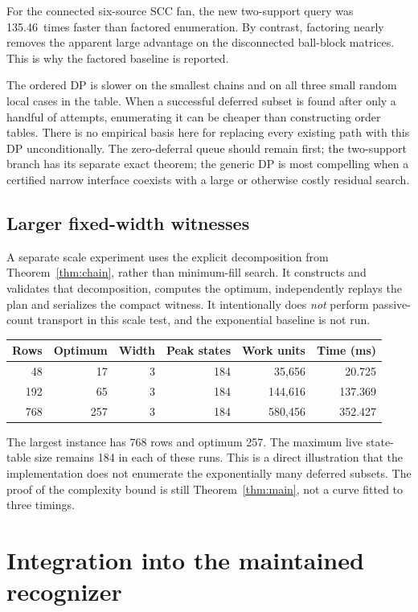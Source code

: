 \documentclass[11pt]{article}
\theoremstyle{definition}\newtheorem{definition}[theorem]{Definition}
\theoremstyle{remark}\newtheorem{remark}[theorem]{Remark}
\newcommand{\FanRatio}{135.46}
\begin{document}
For the connected six-source SCC fan, the new two-support query was \FanRatio\ times faster than factored enumeration. By contrast, factoring nearly removes the apparent large advantage on the disconnected ball-block matrices. This is why the factored baseline is reported.

The ordered DP is slower on the smallest chains and on all three small random local cases in the table. When a successful deferred subset is found after only a handful of attempts, enumerating it can be cheaper than constructing order tables. There is no empirical basis here for replacing every existing path with this DP unconditionally. The zero-deferral queue should remain first; the two-support branch has its separate exact theorem; the generic DP is most compelling when a certified narrow interface coexists with a large or otherwise costly residual search.

\subsection{Larger fixed-width witnesses}
A separate scale experiment uses the explicit decomposition from Theorem~\ref{thm:chain}, rather than minimum-fill search. It constructs and validates that decomposition, computes the optimum, independently replays the plan and serializes the compact witness. It intentionally does \emph{not} perform passive-count transport in this scale test, and the exponential baseline is not run.
\begin{center}
\begin{tabular}{rrrrrr}
\toprule
Rows & Optimum & Width & Peak states & Work units & Time (ms)\\
\midrule
48 & 17 & 3 & 184 & 35,656 & 20.725\\
192 & 65 & 3 & 184 & 144,616 & 137.369\\
768 & 257 & 3 & 184 & 580,456 & 352.427\\
\bottomrule
\end{tabular}

\end{center}
The largest instance has 768 rows and optimum 257. The maximum live state-table size remains 184 in each of these runs. This is a direct illustration that the implementation does not enumerate the exponentially many deferred subsets. The proof of the complexity bound is still Theorem~\ref{thm:main}, not a curve fitted to three timings.

\FloatBarrier
\section{Integration into the maintained recognizer}
\label{sec:integration}
\end{document}
